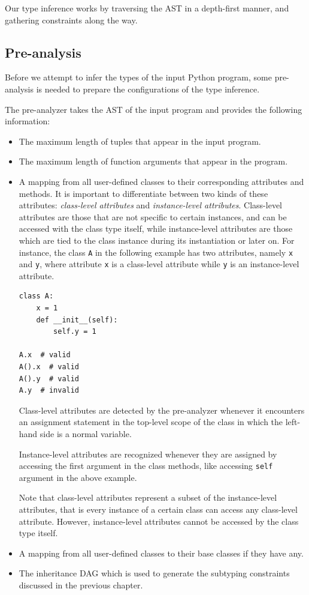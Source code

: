 Our type inference works by traversing the AST in a depth-first manner, and gathering constraints along the way.
\subsection{Pre-analysis}\label{pre}
Before we attempt to infer the types of the input Python program, some pre-analysis is needed to prepare the configurations of the type inference.

The pre-analyzer takes the AST of the input program and provides the following information:

\begin{itemize}
	\item The maximum length of tuples that appear in the input program.
	\item The maximum length of function arguments that appear in the program.
	\item A mapping from all user-defined classes to their corresponding attributes and methods. It is important to differentiate between two kinds of these attributes: \textit{class-level attributes} and \textit{instance-level attributes}. Class-level attributes are those that are not specific to certain instances, and can be accessed with the class type itself, while instance-level attributes are those which are tied to the class instance during its instantiation or later on. For instance, the class \lstinline|A| in the following example has two attributes, namely \lstinline|x| and \lstinline|y|, where attribute \lstinline|x| is a class-level attribute while \lstinline|y| is an instance-level attribute.
	
	\begin{lstlisting}
class A:
	x = 1
	def __init__(self):
		self.y = 1
		
A.x  # valid
A().x  # valid
A().y  # valid
A.y  # invalid
	\end{lstlisting}
	
	Class-level attributes are detected by the pre-analyzer whenever it encounters an assignment statement in the top-level scope of the class in which the left-hand side is a normal variable.
	
	Instance-level attributes are recognized whenever they are assigned by accessing the first argument in the class methods, like accessing \lstinline|self| argument in the above example.
	
	Note that class-level attributes represent a subset of the instance-level attributes, that is every instance of a certain class can access any class-level attribute. However, instance-level attributes cannot be accessed by the class type itself.
	
	\item A mapping from all user-defined classes to their base classes if they have any.
	\item The inheritance DAG which is used to generate the subtyping constraints discussed in the previous chapter.
\end{itemize}

